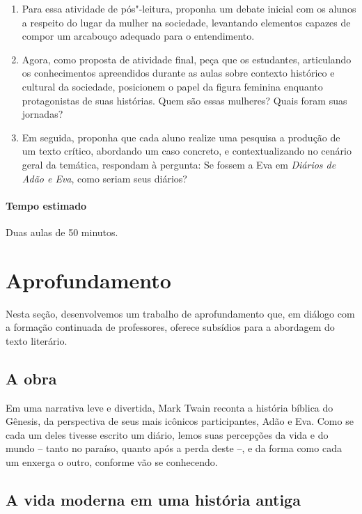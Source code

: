\documentclass[12pt]{extarticle}
\begin{document}
\begin{enumerate}
\item
Para essa atividade de pós"-leitura, proponha um debate inicial com os
alunos a respeito do lugar da mulher na sociedade, levantando elementos capazes 
de compor um arcabouço adequado para o entendimento.

\item
Agora, como proposta de atividade final, peça que os estudantes, articulando
os conhecimentos apreendidos durante as aulas sobre contexto histórico e cultural
da sociedade, posicionem o papel da figura feminina enquanto protagonistas de suas 
histórias. Quem são essas mulheres? Quais foram suas jornadas?

\item
Em seguida, proponha que cada aluno realize uma pesquisa a produção de um texto crítico, 
abordando um caso concreto, e contextualizando no cenário geral da temática, respondam à 
pergunta: 
Se fossem a Eva em \emph{Diários de Adão e Eva}, como seriam seus diários?

\end{enumerate}

\paragraph{Tempo estimado} Duas aulas de 50 minutos. 

\section{Aprofundamento}


Nesta seção, desenvolvemos um trabalho de aprofundamento que, em diálogo
com a formação continuada de professores, oferece subsídios para a
abordagem do texto literário.

\subsection{A obra}

Em uma narrativa leve e divertida, Mark Twain reconta a história bíblica
do Gênesis, da perspectiva de seus mais icônicos participantes, Adão e
Eva. Como se cada um deles tivesse escrito um diário, lemos suas
percepções da vida e do mundo -- tanto no paraíso, quanto após a perda
deste --, e da forma como cada um enxerga o outro, conforme vão se
conhecendo.

\subsection{A vida moderna em uma história antiga}
\end{document}
